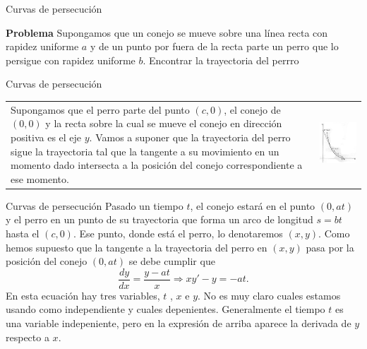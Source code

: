 \documentclass[handout,hyperref={colorlinks=true}]{beamer}
\begin{document}
\begin{frame}{Curvas de persecución}
 
\textbf{Problema} Supongamos que un conejo se mueve sobre una 
línea recta con rapidez uniforme $a$ y de un punto por fuera de la recta parte un perro que lo 
persigue con rapidez uniforme $b$. Encontrar la trayectoria del perrro
 
\begin{center}
\end{center}

 
 
 
\end{frame}

\begin{frame}{Curvas de persecución}
 \begin{tabular}{m{4.5cm} m{5cm}}
Supongamos que el perro parte del punto $(c,0)$, el conejo de $(0,0 )$ y la recta sobre la cual se mueve el conejo en dirección positiva  es el eje $y$. 
Vamos a suponer que la trayectoria del perro sigue la trayectoria tal que 
la tangente a su movimiento en un momento dado intersecta a la posición del conejo correspondiente a ese momento.
& \includegraphics[scale=.4]{imagenes/persecucion.jpg}
\end{tabular}
\end{frame}


\begin{frame}{Curvas de persecución}
Pasado un tiempo $t$, el conejo estará en el punto $(0,at)$ y el perro en un punto de su trayectoria que forma un arco de
 longitud $s=bt$ hasta el $(c,0)$. Ese punto, donde está el perro, lo denotaremos $(x,y)$. Como hemos supuesto que la tangente a la trayectoria del perro en $(x,y)$ pasa 
 por la posición del conejo $(0,at)$ se debe cumplir que
 \begin{equation}\label{eq:persec}\frac{dy}{dx}=\frac{y-at}{x}\Longrightarrow xy'-y=-at.\end{equation}
 En esta ecuación hay tres variables, $t$ , $x$ e $y$. No es muy claro cuales estamos usando como independiente y cuales depenientes. 
 Generalmente el tiempo $t$ es una variable  indepeniente, pero en la expresión de arriba aparece la derivada de $y$ respecto a $x$. 
\end{frame}
\end{document}
